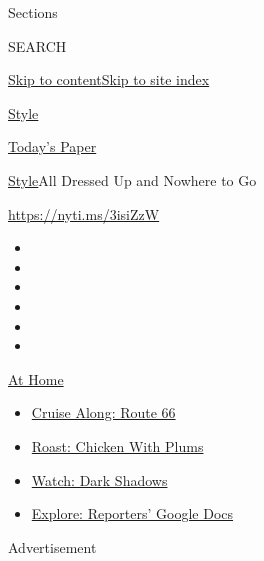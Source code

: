 Sections

SEARCH

\protect\hyperlink{site-content}{Skip to
content}\protect\hyperlink{site-index}{Skip to site index}

\href{https://www.nytimes3xbfgragh.onion/section/style}{Style}

\href{https://myaccount.nytimes3xbfgragh.onion/auth/login?response_type=cookie\&client_id=vi}{}

\href{https://www.nytimes3xbfgragh.onion/section/todayspaper}{Today's
Paper}

\href{/section/style}{Style}\textbar{}All Dressed Up and Nowhere to Go

\url{https://nyti.ms/3isiZzW}

\begin{itemize}
\item
\item
\item
\item
\item
\item
\end{itemize}

\href{https://www.nytimes3xbfgragh.onion/spotlight/at-home?action=click\&pgtype=Article\&state=default\&region=TOP_BANNER\&context=at_home_menu}{At
Home}

\begin{itemize}
\tightlist
\item
  \href{https://www.nytimes3xbfgragh.onion/2020/09/07/travel/route-66.html?action=click\&pgtype=Article\&state=default\&region=TOP_BANNER\&context=at_home_menu}{Cruise
  Along: Route 66}
\item
  \href{https://www.nytimes3xbfgragh.onion/2020/09/04/dining/sheet-pan-chicken.html?action=click\&pgtype=Article\&state=default\&region=TOP_BANNER\&context=at_home_menu}{Roast:
  Chicken With Plums}
\item
  \href{https://www.nytimes3xbfgragh.onion/2020/09/04/arts/television/dark-shadows-stream.html?action=click\&pgtype=Article\&state=default\&region=TOP_BANNER\&context=at_home_menu}{Watch:
  Dark Shadows}
\item
  \href{https://www.nytimes3xbfgragh.onion/interactive/2020/at-home/even-more-reporters-editors-diaries-lists-recommendations.html?action=click\&pgtype=Article\&state=default\&region=TOP_BANNER\&context=at_home_menu}{Explore:
  Reporters' Google Docs}
\end{itemize}

Advertisement

